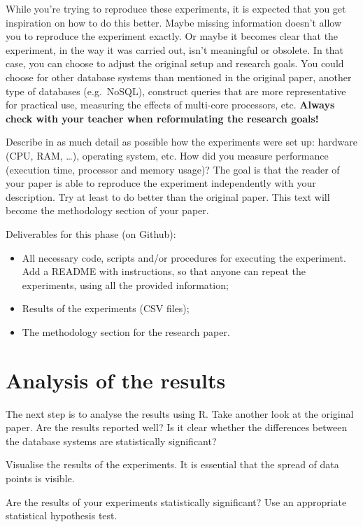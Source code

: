 \documentclass[fleqn,10pt]{artikeltin}
\begin{document}
While you're trying to reproduce these experiments, it is expected that you get inspiration on how to do this better. Maybe missing information doesn't allow you to reproduce the experiment exactly. Or maybe it becomes clear that the experiment, in the way it was carried out, isn't meaningful or obsolete. In that case, you can choose to adjust the original setup and research goals. You could choose for other database systems than mentioned in the original paper, another type of databases (e.g.~NoSQL), construct queries that are more representative for practical use, measuring the effects of multi-core processors, etc. \textbf{Always check with your teacher when reformulating the research goals!}

Describe in as much detail as possible how the experiments were set up: hardware (CPU, RAM, \ldots), operating system, etc. How did you measure performance (execution time, processor and memory usage)? The goal is that the reader of your paper is able to reproduce the experiment independently with your description. Try at least to do better than the original paper. This text will become the methodology section of your paper.

Deliverables for this phase (on Github):

\begin{itemize}
	\item All necessary code, scripts and/or procedures for executing the experiment. Add a README with instructions, so that anyone can repeat the experiments, using all the provided information;
	\item Results of the experiments (CSV files);
	\item The methodology section for the research paper.
\end{itemize}


\section{Analysis of the results}
\label{sec:analysis}

The next step is to analyse the results using R. Take another look at the original paper. Are the results reported well? Is it clear whether the differences between the database systems are statistically significant?

Visualise the results of the experiments. It is essential that the spread of data points is visible.

Are the results of your experiments statistically significant? Use an appropriate statistical hypothesis test.
\end{document}
